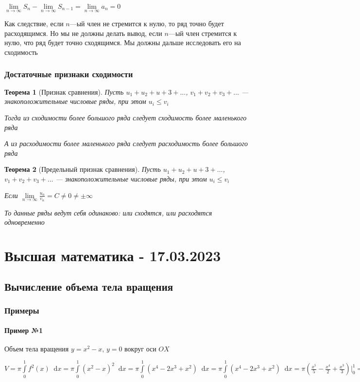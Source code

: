 \documentclass{article}
\newcommand*\diff{\mathop{}\!\mathrm{d}}
\newtheorem{theorem}{Теорема}
\begin{document}
$\lim\limits_{n \to \infty} S_{n} - \lim\limits_{n \to \infty} S_{n - 1} = \lim\limits_{n \to \infty} a_n = 0$

\hfill

Как следствие, если $n$—ый член не стремится к нулю, то ряд точно будет расходящимся. Но мы не должны делать вывод, если $n$—ый член стремится к нулю, что ряд будет точно сходящимся. Мы должны дальше исследовать его на сходимость

\subsubsection{Достаточные признаки сходимости}

\begin{theorem}[Признак сравнения]
    Пусть $u_1 + u_2 + u+3 + \dots$, $v_1 + v_2 + v_3 + \dots$ — знакоположительные числовые ряды, при этом $u_{i} \le v_{i}$

    Тогда из сходимости более большого ряда следует сходимость более маленького ряда

    А из расходимости более маленького ряда следует расходимость более большого ряда
\end{theorem}

\begin{theorem}[Предельный признак сравнения]
    Пусть $u_1 + u_2 + u+3 + \dots$, $v_1 + v_2 + v_3 + \dots$ — знакоположительные числовые ряды, при этом $u_{i} \le v_{i}$

    Если $\lim\limits_{n \to \infty} \frac{u_{n}}{v_{n}} = C \ne 0 \ne \pm \infty$

    То данные ряды ведут себя одинаково: или сходятся, или расходятся одновременно
\end{theorem}

\pagebreak
\section{Высшая математика - 17.03.2023}

\subsection{Вычисление объема тела вращения}

\subsubsection{Примеры}

\paragraph{Пример №1} Объем тела вращения $y = x^2 - x$, $y = 0$ вокруг оси $OX$

$V = \pi \int\limits_{0}^{1} f^2(x) \diff x = \pi \int\limits_{0}^{1} (x^2-x)^2 \diff x = \pi \int\limits_{0}^{1} (x^4 - 2x^3 + x^2) \diff x = \pi \int\limits_{0}^{1} (x^4 - 2x^3 + x^2) \diff x = \pi (\frac{x^5}{5} - \frac{x^4}{2} + \frac{x^3}{3}) \bigg|_{0}^{1} = \pi (\frac{1}{5} - \frac{1}{2} + \frac{1}{3}) = \frac{\pi}{30}$
\end{document}
